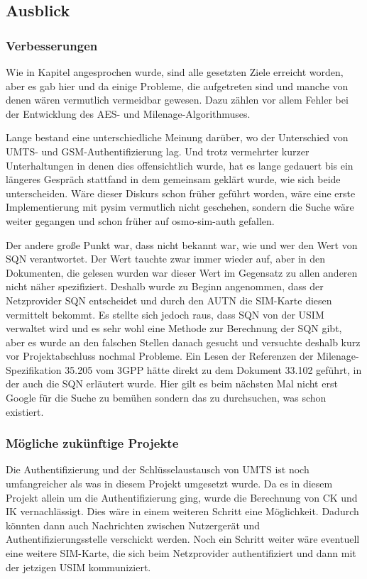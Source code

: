 	\subsection{Ausblick}
		\subsubsection{Verbesserungen}
		Wie in Kapitel  angesprochen wurde, sind alle gesetzten
		Ziele erreicht worden, aber es gab hier und da einige Probleme, die aufgetreten
		sind und manche von denen wären vermutlich vermeidbar gewesen. Dazu zählen vor
		allem Fehler bei der Entwicklung des AES- und Milenage-Algorithmuses.
		
		Lange bestand eine unterschiedliche Meinung darüber, wo der Unterschied von UMTS-
		und GSM-Authentifizierung lag. Und trotz vermehrter kurzer Unterhaltungen in
		denen dies offensichtlich wurde, hat es lange gedauert bis ein längeres Gespräch
		stattfand in dem gemeinsam geklärt wurde, wie sich beide unterscheiden. Wäre
		dieser Diskurs schon früher geführt worden, wäre eine erste Implementierung mit
		pysim vermutlich nicht geschehen, sondern die Suche wäre weiter gegangen und
		schon früher auf osmo-sim-auth gefallen.
		
		Der andere große Punkt war, dass nicht bekannt war, wie und wer den Wert von SQN
		verantwortet. Der Wert tauchte zwar immer wieder auf, aber in den Dokumenten,
		die gelesen wurden war dieser Wert im Gegensatz zu allen anderen nicht näher
		spezifiziert. Deshalb wurde zu Beginn angenommen, dass der Netzprovider SQN
		entscheidet und durch den AUTN die SIM-Karte diesen vermittelt bekommt. Es
		stellte sich jedoch raus, dass SQN von der USIM verwaltet wird und es sehr wohl
		eine Methode zur Berechnung der SQN gibt, aber es wurde an den falschen Stellen
		danach gesucht und versuchte deshalb kurz vor Projektabschluss nochmal Probleme.
		Ein Lesen der Referenzen der Milenage-Spezifikation 35.205 vom 3GPP hätte direkt
		zu dem Dokument 33.102 geführt, in der auch die SQN erläutert wurde. Hier gilt
		es beim nächsten Mal nicht erst Google für die Suche zu bemühen sondern das zu
		durchsuchen, was schon existiert.
		
		\subsubsection{Mögliche zukünftige Projekte}
		Die Authentifizierung und der Schlüsselaustausch von UMTS ist noch umfangreicher
		als was in diesem Projekt umgesetzt wurde. Da es in diesem Projekt allein um die
		Authentifizierung ging, wurde die Berechnung von CK und IK vernachlässigt. Dies
		wäre in einem weiteren Schritt eine Möglichkeit. Dadurch könnten dann auch
		Nachrichten zwischen Nutzergerät und Authentifizierungsstelle verschickt werden.
		Noch ein Schritt weiter wäre eventuell eine weitere SIM-Karte, die sich beim
		Netzprovider authentifiziert und dann mit der jetzigen USIM kommuniziert.

